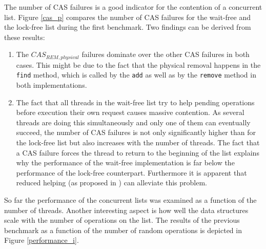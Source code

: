 \documentclass[a4paper, 12pt]{article}
\begin{document}
The number of CAS failures is a good indicator for the contention of a concurrent list. Figure \ref{cas_p} compares the number of CAS failures for the wait-free and the lock-free list during the first benchmark. Two findings can be derived from these results:
\begin{enumerate}
\item{The $CAS_{REM, physical}$ failures dominate over the other CAS failures in both cases. This might be due to the fact that the physical removal happens in the \verb|find| method, which is called by the \verb|add| as well as by the \verb|remove| method in both implementations.}
\item{The fact that all threads in the wait-free list try to help pending operations before execution their own request causes massive contention. As several threads are doing this simultaneously and only one of them can eventually succeed, the number of CAS failures is not only significantly higher than for the lock-free list but also increases with the number of threads. The fact that a CAS failure forces the thread to return to the beginning of the list explains why the performance of the wait-free implementation is far below the performance of the lock-free counterpart. Furthermore it is apparent that reduced helping (as proposed in \cite{timnat12}) can alleviate this problem.}
\end{enumerate}

So far the performance of the concurrent lists was examined as a function of the number of threads. Another interesting aspect is how well the data structures scale with the number of operations on the list. The results of the previous benchmark as a function of the number of random operations is depicted in Figure \ref{performance_i}.
\end{document}

